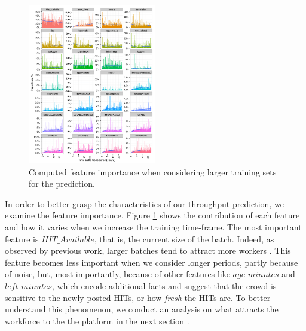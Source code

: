 \begin{figure}[tb]
	\centering
		\includegraphics[width=0.5\textwidth]{figures/importances}
	\caption{Computed feature importance when considering larger training sets for the prediction.}
	\label{fig:importances}
\end{figure}


In order to better grasp the characteristics of our throughput prediction, we examine the feature importance. Figure \ref{fig:importances} shows the  contribution of each feature and how it varies  when we increase the training time-frame.
The most important feature is $HIT\_Available$, that is, the current size of the batch. Indeed, as observed by previous work, larger batches tend to attract more workers \cite{mturk,crowddb}. This feature becomes less important when we consider longer periods, partly because of noise, but, most importantly, because of other features like $age\_minutes$ and $left\_minutes$, which encode additional facts and suggest that the crowd is sensitive to the newly posted HITs, or how \emph{fresh} the HITs are. To better understand this phenomenon, we conduct an analysis on what attracts the workforce to the the platform in the next section .

